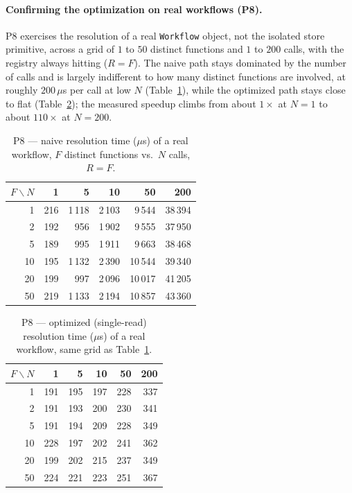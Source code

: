 \paragraph{Confirming the optimization on real workflows (P8).}
P8 exercises the resolution of a real \texttt{Workflow} object, not the isolated store primitive,
across a grid of $1$ to $50$ distinct functions and $1$ to $200$ calls, with the registry always
hitting ($R{=}F$). The naive path stays dominated by the number of calls and is largely
indifferent to how many distinct functions are involved, at roughly $200\,\mu$s per call at low
$N$ (Table~\ref{tab:eval-p8-naive}), while the optimized path stays close to flat
(Table~\ref{tab:eval-p8-optimized}); the measured speedup climbs from about $1\times$ at $N{=}1$
to about $110\times$ at $N{=}200$.

\begin{table}[htbp]
  \centering
  \caption{P8 --- naive resolution time ($\mu$s) of a real workflow, $F$ distinct functions vs.\
  $N$ calls, $R{=}F$.}
  \label{tab:eval-p8-naive}
  \begin{tabular}{rrrrrr}
    \hline
    $F\backslash N$ & 1 & 5 & 10 & 50 & 200 \\
    \hline
    1  & 216 & 1\,118 & 2\,103 & 9\,544  & 38\,394 \\
    2  & 192 & 956    & 1\,902 & 9\,555  & 37\,950 \\
    5  & 189 & 995    & 1\,911 & 9\,663  & 38\,468 \\
    10 & 195 & 1\,132 & 2\,390 & 10\,544 & 39\,340 \\
    20 & 199 & 997    & 2\,096 & 10\,017 & 41\,205 \\
    50 & 219 & 1\,133 & 2\,194 & 10\,857 & 43\,360 \\
    \hline
  \end{tabular}
\end{table}

\begin{table}[htbp]
  \centering
  \caption{P8 --- optimized (single-read) resolution time ($\mu$s) of a real workflow, same grid
  as Table~\ref{tab:eval-p8-naive}.}
  \label{tab:eval-p8-optimized}
  \begin{tabular}{rrrrrr}
    \hline
    $F\backslash N$ & 1 & 5 & 10 & 50 & 200 \\
    \hline
    1  & 191 & 195 & 197 & 228 & 337 \\
    2  & 191 & 193 & 200 & 230 & 341 \\
    5  & 191 & 194 & 209 & 228 & 349 \\
    10 & 228 & 197 & 202 & 241 & 362 \\
    20 & 199 & 202 & 215 & 237 & 349 \\
    50 & 224 & 221 & 223 & 251 & 367 \\
    \hline
  \end{tabular}
\end{table}

